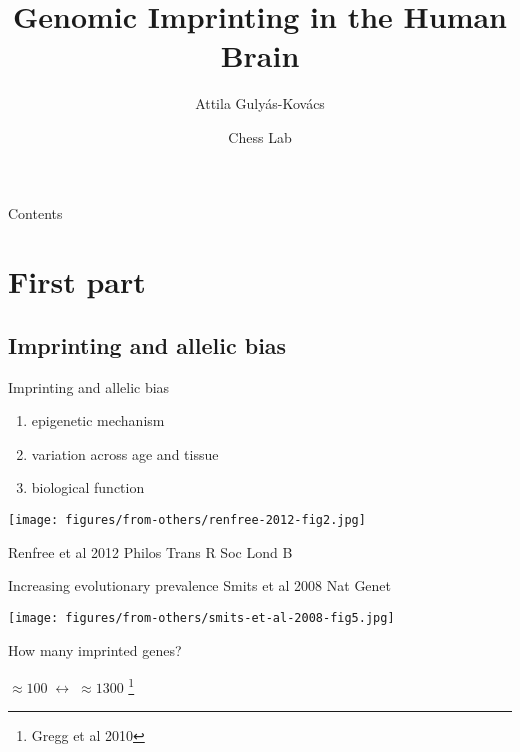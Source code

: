 \documentclass{beamer} %
\title{Genomic Imprinting in the Human Brain}
\author{Attila Guly\'{a}s-Kov\'{a}cs}
\date{Chess Lab}
\begin{document}
\begin{frame}[plain, label=title]
\maketitle
\end{frame}

\begin{frame}{Contents}
\tableofcontents
\end{frame}

\section{First part}

\subsection{Imprinting and allelic bias}

\begin{frame}{Imprinting and allelic bias}
\begin{enumerate}
\item epigenetic mechanism
\item variation across age and tissue
\item biological function 
\end{enumerate}
\texttt{[image: figures/from-others/renfree-2012-fig2.jpg]}

{\tiny Renfree et al 2012 Philos Trans R Soc Lond B}

\end{frame}

\begin{frame}{Increasing evolutionary prevalence}{}
{\tiny Smits et al 2008 Nat Genet}

\texttt{[image: figures/from-others/smits-et-al-2008-fig5.jpg]}

\begin{flushright}
How many imprinted genes?

\(\approx 100 \; \leftrightarrow \; \approx 1300\) \footnote{Gregg et al 2010}
\end{flushright}
\end{frame}
\end{document}

